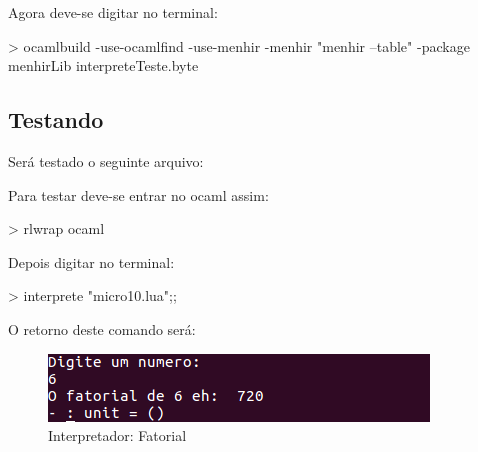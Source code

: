 \documentclass[12pt,a4paper]{report}
\begin{document}
Agora deve-se digitar no terminal: 

\begin{terminal}
> ocamlbuild -use-ocamlfind -use-menhir -menhir "menhir --table" -package menhirLib interpreteTeste.byte
\end{terminal}

\subsection{Testando}

Será testado o seguinte arquivo:




Para testar deve-se entrar no ocaml assim:

\begin{terminal}
> rlwrap ocaml
\end{terminal}

Depois digitar no terminal:

\begin{terminal}
> interprete "micro10.lua";;
\end{terminal}

O retorno deste comando será:

\begin{figure}[!htb]
\centering
\includegraphics[scale=0.9]{codigos/Interpretador/fat.png}
\caption{Interpretador: Fatorial}
\label{fatorial}
\end{figure}
\end{document}
